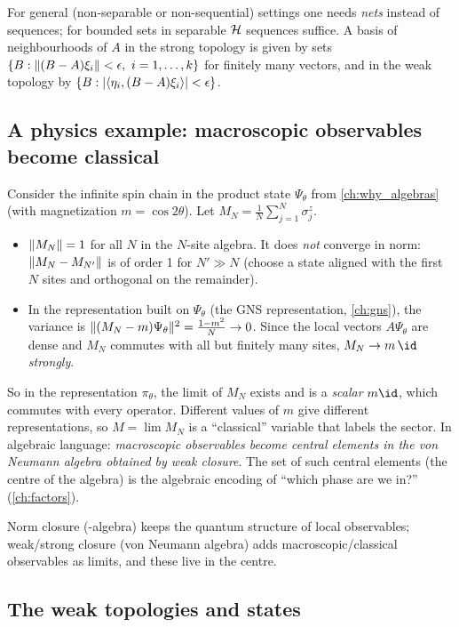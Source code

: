 For general (non-separable or non-sequential) settings one needs \emph{nets} instead of sequences; for bounded sets in separable $\mathcal{H}$ sequences suffice. A basis of neighbourhoods of $A$ in the strong topology is given by sets $\{B:\norm{(B-A)\xi_i}<\epsilon,\ i=1,\dots,k\}$ for finitely many vectors, and in the weak topology by $\{B:|\langle \eta_i,(B-A)\xi_i\rangle|<\epsilon\}$.

\subsection{A physics example: macroscopic observables become classical}

Consider the infinite spin chain in the product state $\Psi_\theta$ from \cref{ch:why_algebras} (with magnetization $m=\cos2\theta$). Let $M_N=\frac1N\sum_{j=1}^N\sigma^z_j$.

\begin{itemize}
\item $\lVert M_N\rVert=1$ for all $N$ in the $N$-site algebra. It does \emph{not} converge in norm: $\lVert M_N-M_{N'}\rVert$ is of order 1 for $N'\gg N$ (choose a state aligned with the first $N$ sites and orthogonal on the remainder).
\item In the representation built on $\Psi_\theta$ (the GNS representation, \cref{ch:gns}), the variance is $\lVert (M_N-m)\Psi_\theta\rVert^2=\frac{1-m^2}{N}\to0$. Since the local vectors $A\Psi_\theta$ are dense and $M_N$ commutes with all but finitely many sites, $M_N\to m\,\id$ \emph{strongly}.
\end{itemize}
So in the representation $\pi_\theta$, the limit of $M_N$ exists and is a \emph{scalar} $m\id$, which commutes with every operator. Different values of $m$ give different representations, so $M=\lim M_N$ is a ``classical'' variable that labels the sector. In algebraic language: \emph{macroscopic observables become central elements in the von Neumann algebra obtained by weak closure}. The set of such central elements (the centre of the algebra) is the algebraic encoding of ``which phase are we in?'' (\cref{ch:factors}).

\begin{keyidea}
Norm closure (\cstar-algebra) keeps the quantum structure of local observables; weak/strong closure (von Neumann algebra) adds macroscopic/classical observables as limits, and these live in the centre.
\end{keyidea}

\subsection{The weak topologies and states}

